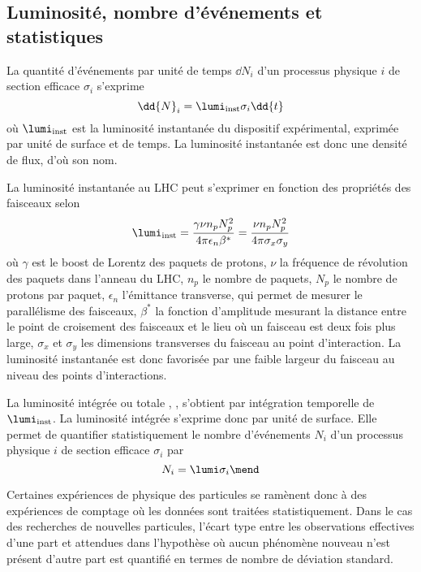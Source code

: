 \subsection{Luminosité, nombre d'événements et statistiques}\label{chapter-LHC-section-LHC-subsec-lumi}
La quantité d'événements par unité de temps $\dd{N}_i$ d'un processus physique $i$ de section efficace $\sigma_i$ s'exprime
\begin{equation}
\dd{N}_i = \lumi_\text{inst} \sigma_i \dd{t}
\end{equation}
où $\lumi_\text{inst}$ est la luminosité instantanée du dispositif expérimental, exprimée par unité de surface et de temps.
La luminosité instantanée est donc une densité de flux, d'où son nom.
\par La luminosité instantanée au LHC peut s'exprimer en fonction des propriétés des faisceaux selon
\begin{equation}
\lumi_\text{inst}
= \frac{\gamma\nu n_p N_p^2}{4\pi\epsilon_n\beta^*}
= \frac{\nu n_p N_p^2}{4\pi\sigma_x\sigma_y}
\end{equation}
où
$\gamma$ est le boost de Lorentz des paquets de protons,
$\nu$ la fréquence de révolution des paquets dans l'anneau du LHC,
$n_p$ le nombre de paquets,
$N_p$ le nombre de protons par paquet,
$\epsilon_n$ l'émittance transverse, qui permet de mesurer le parallélisme des faisceaux,
$\beta^*$ la fonction d'amplitude mesurant la distance entre le point de croisement des faisceaux et le lieu où un faisceau est deux fois plus large,
$\sigma_x$ et $\sigma_y$ les dimensions transverses du faisceau au point d'interaction.
La luminosité instantanée est donc favorisée par une faible largeur du faisceau au niveau des points d'interactions.
\par La luminosité intégrée ou \og totale \fg, \lumi, s'obtient par intégration temporelle de $\lumi_\text{inst}$.
La luminosité intégrée s'exprime donc par unité de surface.
Elle permet de quantifier statistiquement le nombre d'événements $N_i$ d'un processus physique $i$ de section efficace $\sigma_i$ par
\begin{equation}
N_i = \lumi \sigma_i
\mend
\end{equation}
\par Certaines expériences de physique des particules se ramènent donc à des expériences de comptage où les données sont traitées statistiquement.
Dans le cas des recherches de nouvelles particules, l'écart type entre les observations effectives d'une part et attendues dans l'hypothèse où aucun phénomène nouveau n'est présent d'autre part est quantifié en termes de nombre de déviation standard.

